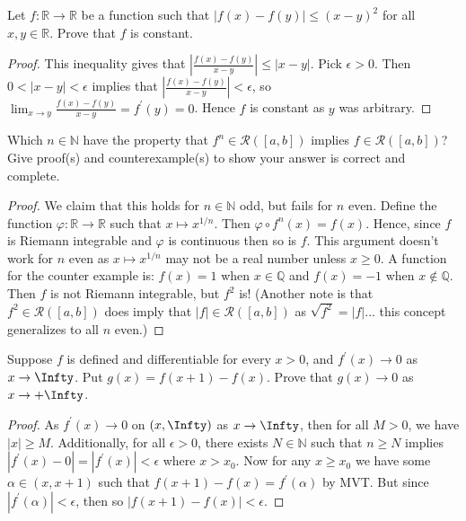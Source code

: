 \documentclass[oneside]{amsart}
\theoremstyle{definition}
\newcommand{\rr}{\mathbb R}
\newcommand{\nn}{\mathbb N}
\newcommand{\qq}{\mathbb Q}
\newcommand{\pp}{\prime}
\begin{document}
\begin{tcolorbox}[colback=black!5!white,colframe=black!75!black,title= Exercise $6.2.$]Let $f \colon \rr \to \rr$ be a function such that $|f(x) - f(y) | \leq (x-y)^2$ for all $x, y \in \rr$. Prove that $f$ is constant.
\tcblower 
\begin{proof} This inequality gives that $\left| \frac{f(x)-f(y)}{x-y} \right | \leq |x-y|$. Pick $\epsilon > 0$. Then $0 < |x-y | < \epsilon$ implies that $\left| \frac{f(x)-f(y)}{x-y} \right | < \epsilon$, so $ \lim_{x\to y} \frac{f(x)-f(y)}{x-y}  = f^\pp (y) =0$. Hence $f$ is constant as $y$ was arbitrary. 
\end{proof} 
\end{tcolorbox}


\begin{tcolorbox}[colback=black!5!white,colframe=black!75!black,title= Exercise $6.3.$] Which $n \in \nn$ have the property that $f^n \in \mathcal R([a,b])$ implies $f \in \mathcal R([a,b])$? Give proof(s) and counterexample(s) to show your answer is correct and complete.
\tcblower 
\begin{proof} We claim that this holds for $n \in \nn$ odd, but fails for $n$ even. Define the function $\varphi \colon \rr \to \rr$ such that $x \mapsto x^{1/n}$. Then $\varphi \circ f^n(x) = f(x)$. Hence, since $f$ is Riemann integrable and $\varphi$ is continuous then so is $f$. This argument doesn't work for $n$ even as $x \mapsto x^{1/n}$ may not be a real number unless $x \geq 0$. A function for the counter example is: $f(x) = 1$ when $x \in \qq$ and $f(x)=-1$ when $x \notin \qq$. Then $f$ is not Riemann integrable, but $f^2$ is! (Another note is that $f^2 \in \mathcal R([a,b])$ does imply that $|f| \in \mathcal R([a,b])$ as $\sqrt{f^2} = |f|$... this concept generalizes to all $n$ even.)
\end{proof} 
\end{tcolorbox}


\begin{tcolorbox}[colback=black!5!white,colframe=black!75!black,title= Exercise $6.4.$] Suppose $f$ is defined and differentiable for every $x > 0$, and $f^\pp (x) \to 0$ as $x \to \Infty$. Put $g(x) = f(x+1) - f(x)$. Prove that $g(x) \to 0$ as $x \to + \Infty$.
\tcblower 
\begin{proof} As $f^\pp (x) \to 0$ on $(x, \Infty)$ as $x \to \Infty$, then for all $M > 0$, we have $|x| \geq M$. Additionally, for all $\epsilon > 0$, there exists $N \in \nn$ such that $n \geq N$ implies $|f^\pp (x) -0 | = |f^\pp (x)| < \epsilon$ where $x > x_0$. Now for any $x \geq x_0$ we have some $\alpha \in (x,x+1)$ such that $f(x+1)-f(x) = f^\pp (\alpha)$ by MVT.  But since $|f^\pp (\alpha )|< \epsilon $, then so $|f(x+1)-f(x)| < \epsilon$.
\end{proof} 
\end{tcolorbox}
\end{document}
